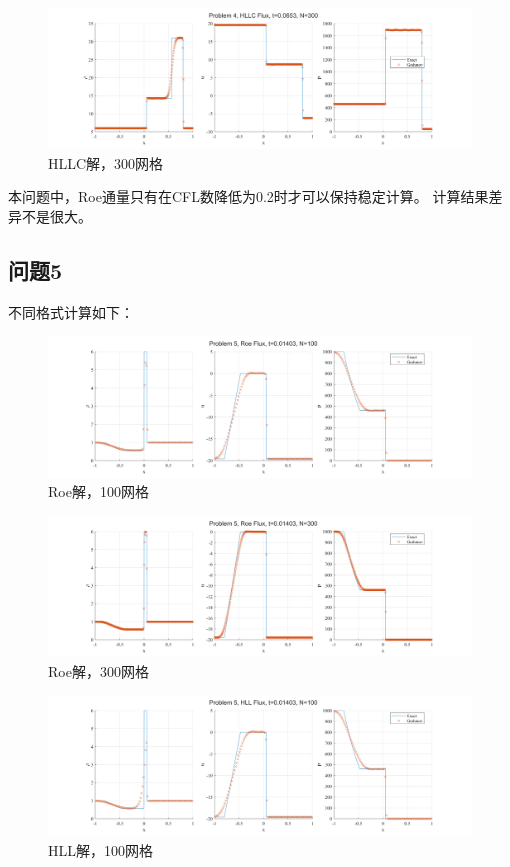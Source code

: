 \documentclass[UTF8,zihao=5]{ctexart} %
\begin{document}
\begin{figure}[H]
    \centering
    \includegraphics[width=18cm]{p4_HLLC_N300.png}  %
    \caption{HLLC解，300网格}
\end{figure}

本问题中，Roe通量只有在CFL数降低为0.2时才可以保持稳定计算。
计算结果差异不是很大。


\subsection{问题5}

不同格式计算如下：

\begin{figure}[H]
    \centering
    \includegraphics[width=18cm]{p5_Roe_N100.png}  %
    \caption{Roe解，100网格}
\end{figure}

\begin{figure}[H]
    \centering
    \includegraphics[width=18cm]{p5_Roe_N300.png}  %
    \caption{Roe解，300网格}
\end{figure}

\begin{figure}[H]
    \centering
    \includegraphics[width=18cm]{p5_HLL_N100.png}  %
    \caption{HLL解，100网格}
\end{figure}
\end{document}

